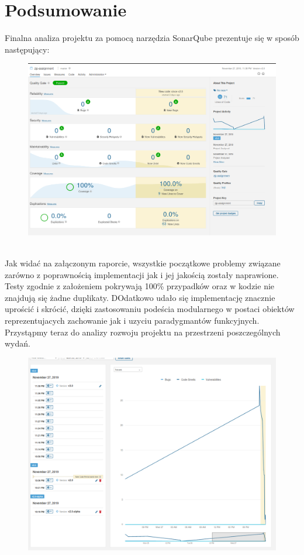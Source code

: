 \documentclass[a4paper, 11pt]{article}
\begin{document}
\section{Podsumowanie}
Finalna analiza projektu za pomocą narzędzia SonarQube prezentuje się w sposób następujący:
\begin{figure}[!tbh]
\includegraphics[width=16cm]{final_ov}
\centering
\end{figure}\\
Jak widać na załączonym raporcie, wszystkie początkowe problemy związane zarówno z poprawnością implementacji jak i jej jakością zostały naprawione. Testy zgodnie z założeniem pokrywają 100\% przypadków oraz w kodzie nie znajdują się żadne duplikaty. DOdatkowo udało się implementację znacznie uprościć i skrócić, dzięki zastosowaniu podeścia modularnego w postaci obiektów reprezentujacych zachowanie jak i uzyciu paradygmantów funkcyjnych.
Przystąpmy teraz do analizy rozwoju projektu na przestrzeni poszczególnych wydań.
\begin{figure}[!tbh]
\includegraphics[width=16cm]{final_issues}
\centering
\end{figure}\\
\end{document}

